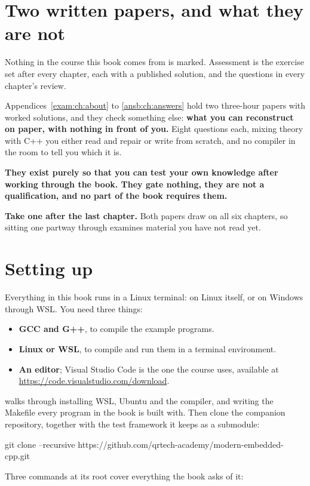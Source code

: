 \section*{Two written papers, and what they are not}
Nothing in the course this book comes from is marked. Assessment is the exercise set after every
chapter, each with a published solution, and the questions in every chapter's review.

Appendices~\ref{exam:ch:about} to \ref{ansb:ch:answers} hold two three-hour papers with worked
solutions, and they check something else: \textbf{what you can reconstruct on paper, with nothing
in front of you.} Eight questions each, mixing theory with C++ you either read and repair or write
from scratch, and no compiler in the room to tell you which it is.

\textbf{They exist purely so that you can test your own knowledge after working through the book.
They gate nothing, they are not a qualification, and no part of the book requires them.}

\textbf{Take one after the last chapter.} Both papers draw on all six chapters, so sitting one
partway through examines material you have not read yet.

\section*{Setting up}
Everything in this book runs in a Linux terminal: on Linux itself, or on Windows through WSL. You
need three things:
\begin{itemize}
  \item \textbf{GCC and G++}, to compile the example programs.
  \item \textbf{Linux or WSL}, to compile and run them in a terminal environment.
  \item \textbf{An editor}; Visual Studio Code is the one the course uses, available at
    \url{https://code.visualstudio.com/download}.
\end{itemize}
 walks through installing WSL, Ubuntu and the compiler, and writing the
Makefile every program in the book is built with. Then clone the companion repository, together
with the test framework it keeps as a submodule:

\begin{shell}
git clone --recursive https://github.com/qrtech-academy/modern-embedded-cpp.git
\end{shell}

\noindent Three commands at its root cover everything the book asks of it:

